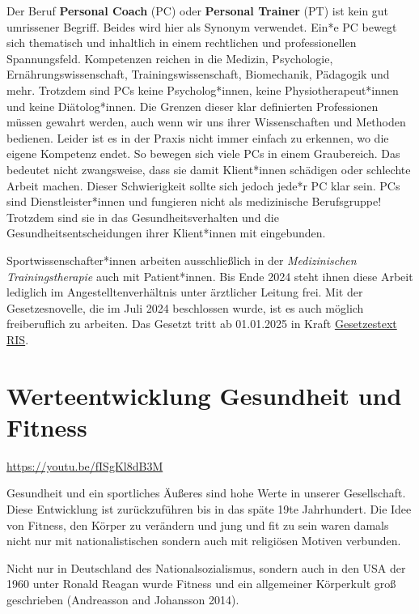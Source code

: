 \documentclass[
  letterpaper,
  DIV=11,
  numbers=noendperiod]{scrreprt}
\begin{document}
Der Beruf \textbf{Personal Coach} (PC) oder \textbf{Personal Trainer}
(PT) ist kein gut umrissener Begriff. Beides wird hier als Synonym
verwendet. Ein*e PC bewegt sich thematisch und inhaltlich in einem
rechtlichen und professionellen Spannungsfeld. Kompetenzen reichen in
die Medizin, Psychologie, Ernährungswissenschaft, Trainingswissenschaft,
Biomechanik, Pädagogik und mehr. Trotzdem sind PCs keine
Psycholog*innen, keine Physiotherapeut*innen und keine Diätolog*innen.
Die Grenzen dieser klar definierten Professionen müssen gewahrt werden,
auch wenn wir uns ihrer Wissenschaften und Methoden bedienen. Leider ist
es in der Praxis nicht immer einfach zu erkennen, wo die eigene
Kompetenz endet. So bewegen sich viele PCs in einem Graubereich. Das
bedeutet nicht zwangsweise, dass sie damit Klient*innen schädigen oder
schlechte Arbeit machen. Dieser Schwierigkeit sollte sich jedoch jede*r
PC klar sein. PCs sind Dienstleister*innen und fungieren nicht als
medizinische Berufsgruppe! Trotzdem sind sie in das Gesundheitsverhalten
und die Gesundheitsentscheidungen ihrer Klient*innen mit eingebunden.

Sportwissenschafter*innen arbeiten ausschließlich in der
\emph{Medizinischen Trainingstherapie} auch mit Patient*innen. Bis Ende
2024 steht ihnen diese Arbeit lediglich im Angestelltenverhältnis unter
ärztlicher Leitung frei. Mit der Gesetzesnovelle, die im Juli 2024
beschlossen wurde, ist es auch möglich freiberuflich zu arbeiten. Das
Gesetzt tritt ab 01.01.2025 in Kraft
\href{https://www.ris.bka.gv.at/Dokumente/BgblAuth/BGBLA_2024_I_100/BGBLA_2024_I_100.html}{Gesetzestext
RIS}.

\section{Werteentwicklung Gesundheit und
Fitness}\label{werteentwicklung-gesundheit-und-fitness}

\url{https://youtu.be/fISgKl8dB3M}

Gesundheit und ein sportliches Äußeres sind hohe Werte in unserer
Gesellschaft. Diese Entwicklung ist zurückzuführen bis in das späte 19te
Jahrhundert. Die Idee von Fitness, den Körper zu verändern und jung und
fit zu sein waren damals nicht nur mit nationalistischen sondern auch
mit religiösen Motiven verbunden.

Nicht nur in Deutschland des Nationalsozialismus, sondern auch in den
USA der 1960 unter Ronald Reagan wurde Fitness und ein allgemeiner
Körperkult groß geschrieben (Andreasson and Johansson 2014).
\end{document}
